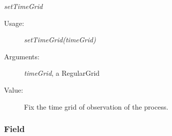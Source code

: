 \begin{description}
\begin{description}
\item \textit{setTimeGrid}
\begin{description}
\item[Usage:] \textit{setTimeGrid(timeGrid)}
\item[Arguments:] \textit{timeGrid}, a RegularGrid
\item[Value:] Fix the time grid of observation of the process.
\end{description}

\end{description}

\end{description}






\newpage
{}
\subsubsection{Field}



